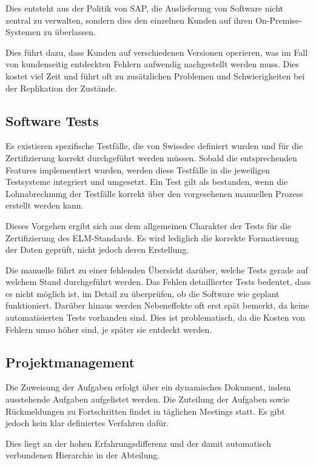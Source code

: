 Dies entsteht aus der Politik von SAP, die Auslieferung von Software nicht zentral zu verwalten, sondern dies den einzelnen Kunden auf ihren On-Premise-Systemen zu überlassen.

Dies führt dazu, dass Kunden auf verschiedenen Versionen operieren, was im Fall von kundenseitig entdeckten Fehlern aufwendig nachgestellt werden muss.
 Dies kostet viel Zeit und führt oft zu zusätzlichen Problemen und Schwierigkeiten bei der Replikation der Zustände.
 
\subsection{Software Tests}

Es existieren spezifische Testfälle, die von Swissdec definiert wurden und für die Zertifizierung korrekt durchgeführt werden müssen. Sobald die entsprechenden Features implementiert wurden, werden diese Testfälle in die jeweiligen Testsysteme integriert und umgesetzt. Ein Test gilt als bestanden, wenn die Lohnabrechnung der Testfälle korrekt über den vorgesehenen manuellen Prozess erstellt werden kann.

Dieses Vorgehen ergibt sich aus dem allgemeinen Charakter der Tests für die Zertifizierung des ELM-Standards. Es wird lediglich die korrekte Formatierung der Daten geprüft, nicht jedoch deren Erstellung.

Die manuelle führt zu einer fehlenden Übersicht darüber, welche Tests gerade auf welchem Stand durchgeführt werden.
Das Fehlen detaillierter Tests bedeutet, dass es nicht möglich ist, im Detail zu überprüfen, ob die Software wie geplant funktioniert.
Darüber hinaus werden Nebeneffekte oft erst spät bemerkt, da keine automatisierten Tests vorhanden sind. Dies ist problematisch, da die Kosten von Fehlern umso höher sind, je später sie entdeckt werden.

\subsection{Projektmanagement}

Die Zuweisung der Aufgaben erfolgt über ein dynamisches Dokument, indem ausstehende Aufgaben aufgelistet werden.
Die Zuteilung der Aufgaben sowie Rückmeldungen zu Fortschritten findet in täglichen Meetings statt. Es gibt jedoch kein klar definiertes Verfahren dafür.

Dies liegt an der hohen Erfahrungsdifferenz und der damit automatisch verbundenen Hierarchie in der Abteilung.

